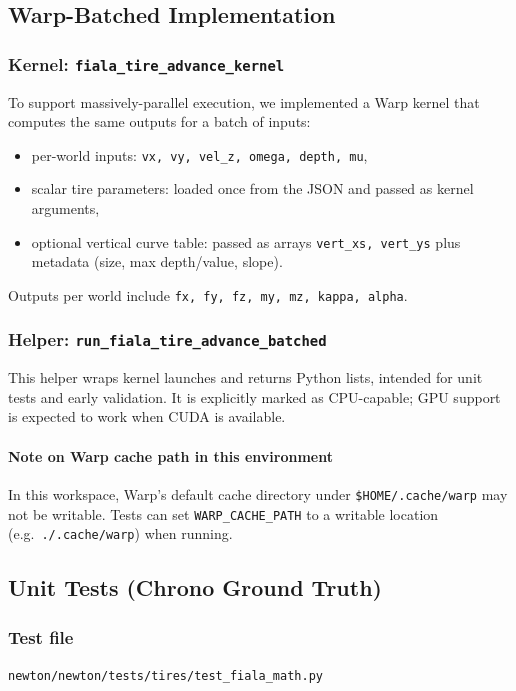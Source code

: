\subsection{Warp-Batched Implementation}
\subsubsection{Kernel: \texttt{fiala\_tire\_advance\_kernel}}
To support massively-parallel execution, we implemented a Warp kernel that computes the same outputs for a batch of inputs:
\begin{itemize}
  \item per-world inputs: \texttt{vx, vy, vel\_z, omega, depth, mu},
  \item scalar tire parameters: loaded once from the JSON and passed as kernel arguments,
  \item optional vertical curve table: passed as arrays \texttt{vert\_xs, vert\_ys} plus metadata (size, max depth/value, slope).
\end{itemize}
Outputs per world include \texttt{fx, fy, fz, my, mz, kappa, alpha}.

\subsubsection{Helper: \texttt{run\_fiala\_tire\_advance\_batched}}
This helper wraps kernel launches and returns Python lists, intended for unit tests and early validation.
It is explicitly marked as CPU-capable; GPU support is expected to work when CUDA is available.

\paragraph{Note on Warp cache path in this environment}
In this workspace, Warp's default cache directory under \texttt{\$HOME/.cache/warp} may not be writable.
Tests can set \texttt{WARP\_CACHE\_PATH} to a writable location (e.g.\ \texttt{./.cache/warp}) when running.

\subsection{Unit Tests (Chrono Ground Truth)}
\subsubsection{Test file}
\texttt{newton/newton/tests/tires/test\_fiala\_math.py}

